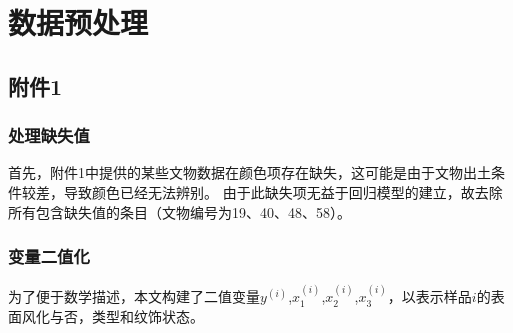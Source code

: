 \section{数据预处理} %
\label{sec:数据预处理}

\subsection{附件1} %
\label{sub:附件1}


\subsubsection{处理缺失值} %
\label{ssub:处理缺失值}

首先，附件1中提供的某些文物数据在颜色项存在缺失，这可能是由于文物出土条件较差，导致颜色已经无法辨别。
由于此缺失项无益于回归模型的建立，故去除所有包含缺失值的条目（文物编号为19、40、48、58）。


\subsubsection{变量二值化} %
\label{ssub:变量二值化}

为了便于数学描述，本文构建了二值变量$y^{(i)}$,$x^{(i)}_1$,$x^{(i)}_2$,$x^{(i)}_3$，以表示样品$i$的表面风化与否，类型和纹饰状态。

